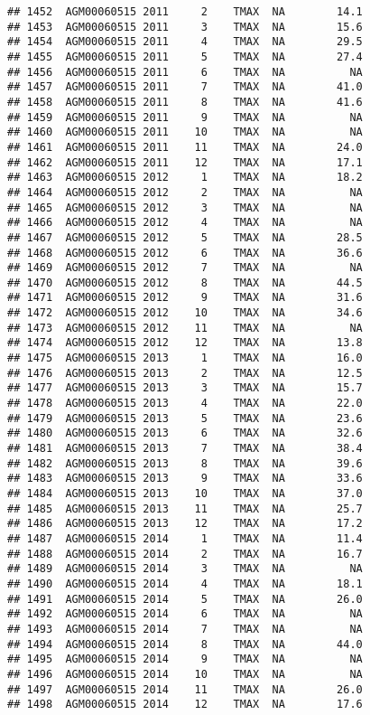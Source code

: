\documentclass{article}\usepackage[]{graphicx}\usepackage[]{color}
\makeatletter
\newenvironment{kframe}{%
 \def\at@end@of@kframe{}%
 \ifinner\ifhmode%
  \def\at@end@of@kframe{\end{minipage}}%
  \begin{minipage}{\columnwidth}%
 \fi\fi%
 \def\FrameCommand##1{\hskip\@totalleftmargin \hskip-\fboxsep
 \colorbox{shadecolor}{##1}\hskip-\fboxsep
     \hskip-\linewidth \hskip-\@totalleftmargin \hskip\columnwidth}%
 \MakeFramed {\advance\hsize-\width
   \@totalleftmargin\z@ \linewidth\hsize
   \@setminipage}}%
 {\par\unskip\endMakeFramed%
 \at@end@of@kframe}
\newenvironment{knitrout}{}{} %
\makeatother
\begin{document}
\begin{knitrout}
\begin{kframe}
\begin{verbatim}
## 1452  AGM00060515 2011     2    TMAX  NA        14.1
## 1453  AGM00060515 2011     3    TMAX  NA        15.6
## 1454  AGM00060515 2011     4    TMAX  NA        29.5
## 1455  AGM00060515 2011     5    TMAX  NA        27.4
## 1456  AGM00060515 2011     6    TMAX  NA          NA
## 1457  AGM00060515 2011     7    TMAX  NA        41.0
## 1458  AGM00060515 2011     8    TMAX  NA        41.6
## 1459  AGM00060515 2011     9    TMAX  NA          NA
## 1460  AGM00060515 2011    10    TMAX  NA          NA
## 1461  AGM00060515 2011    11    TMAX  NA        24.0
## 1462  AGM00060515 2011    12    TMAX  NA        17.1
## 1463  AGM00060515 2012     1    TMAX  NA        18.2
## 1464  AGM00060515 2012     2    TMAX  NA          NA
## 1465  AGM00060515 2012     3    TMAX  NA          NA
## 1466  AGM00060515 2012     4    TMAX  NA          NA
## 1467  AGM00060515 2012     5    TMAX  NA        28.5
## 1468  AGM00060515 2012     6    TMAX  NA        36.6
## 1469  AGM00060515 2012     7    TMAX  NA          NA
## 1470  AGM00060515 2012     8    TMAX  NA        44.5
## 1471  AGM00060515 2012     9    TMAX  NA        31.6
## 1472  AGM00060515 2012    10    TMAX  NA        34.6
## 1473  AGM00060515 2012    11    TMAX  NA          NA
## 1474  AGM00060515 2012    12    TMAX  NA        13.8
## 1475  AGM00060515 2013     1    TMAX  NA        16.0
## 1476  AGM00060515 2013     2    TMAX  NA        12.5
## 1477  AGM00060515 2013     3    TMAX  NA        15.7
## 1478  AGM00060515 2013     4    TMAX  NA        22.0
## 1479  AGM00060515 2013     5    TMAX  NA        23.6
## 1480  AGM00060515 2013     6    TMAX  NA        32.6
## 1481  AGM00060515 2013     7    TMAX  NA        38.4
## 1482  AGM00060515 2013     8    TMAX  NA        39.6
## 1483  AGM00060515 2013     9    TMAX  NA        33.6
## 1484  AGM00060515 2013    10    TMAX  NA        37.0
## 1485  AGM00060515 2013    11    TMAX  NA        25.7
## 1486  AGM00060515 2013    12    TMAX  NA        17.2
## 1487  AGM00060515 2014     1    TMAX  NA        11.4
## 1488  AGM00060515 2014     2    TMAX  NA        16.7
## 1489  AGM00060515 2014     3    TMAX  NA          NA
## 1490  AGM00060515 2014     4    TMAX  NA        18.1
## 1491  AGM00060515 2014     5    TMAX  NA        26.0
## 1492  AGM00060515 2014     6    TMAX  NA          NA
## 1493  AGM00060515 2014     7    TMAX  NA          NA
## 1494  AGM00060515 2014     8    TMAX  NA        44.0
## 1495  AGM00060515 2014     9    TMAX  NA          NA
## 1496  AGM00060515 2014    10    TMAX  NA          NA
## 1497  AGM00060515 2014    11    TMAX  NA        26.0
## 1498  AGM00060515 2014    12    TMAX  NA        17.6

\end{verbatim}
\end{kframe}
\end{knitrout}
\end{document}
